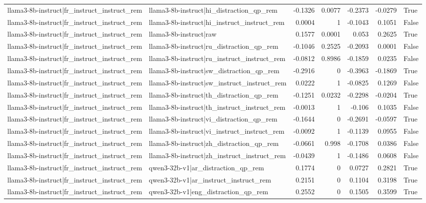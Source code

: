 \begin{table}
\begin{tabular}{l l r r r r l}
llama3-8b-instruct|fr_instruct_instruct_rem & llama3-8b-instruct|hi_distraction_qp_rem & -0.1326 & 0.0077 & -0.2373 & -0.0279 & True \\
llama3-8b-instruct|fr_instruct_instruct_rem & llama3-8b-instruct|hi_instruct_instruct_rem & 0.0004 & 1 & -0.1043 & 0.1051 & False \\
llama3-8b-instruct|fr_instruct_instruct_rem & llama3-8b-instruct|raw & 0.1577 & 0.0001 & 0.053 & 0.2625 & True \\
llama3-8b-instruct|fr_instruct_instruct_rem & llama3-8b-instruct|ru_distraction_qp_rem & -0.1046 & 0.2525 & -0.2093 & 0.0001 & False \\
llama3-8b-instruct|fr_instruct_instruct_rem & llama3-8b-instruct|ru_instruct_instruct_rem & -0.0812 & 0.8986 & -0.1859 & 0.0235 & False \\
llama3-8b-instruct|fr_instruct_instruct_rem & llama3-8b-instruct|sw_distraction_qp_rem & -0.2916 & 0 & -0.3963 & -0.1869 & True \\
llama3-8b-instruct|fr_instruct_instruct_rem & llama3-8b-instruct|sw_instruct_instruct_rem & 0.0222 & 1 & -0.0825 & 0.1269 & False \\
llama3-8b-instruct|fr_instruct_instruct_rem & llama3-8b-instruct|th_distraction_qp_rem & -0.1251 & 0.0232 & -0.2298 & -0.0204 & True \\
llama3-8b-instruct|fr_instruct_instruct_rem & llama3-8b-instruct|th_instruct_instruct_rem & -0.0013 & 1 & -0.106 & 0.1035 & False \\
llama3-8b-instruct|fr_instruct_instruct_rem & llama3-8b-instruct|vi_distraction_qp_rem & -0.1644 & 0 & -0.2691 & -0.0597 & True \\
llama3-8b-instruct|fr_instruct_instruct_rem & llama3-8b-instruct|vi_instruct_instruct_rem & -0.0092 & 1 & -0.1139 & 0.0955 & False \\
llama3-8b-instruct|fr_instruct_instruct_rem & llama3-8b-instruct|zh_distraction_qp_rem & -0.0661 & 0.998 & -0.1708 & 0.0386 & False \\
llama3-8b-instruct|fr_instruct_instruct_rem & llama3-8b-instruct|zh_instruct_instruct_rem & -0.0439 & 1 & -0.1486 & 0.0608 & False \\
llama3-8b-instruct|fr_instruct_instruct_rem & qwen3-32b-v1|ar_distraction_qp_rem & 0.1774 & 0 & 0.0727 & 0.2821 & True \\
llama3-8b-instruct|fr_instruct_instruct_rem & qwen3-32b-v1|ar_instruct_instruct_rem & 0.2151 & 0 & 0.1104 & 0.3198 & True \\
llama3-8b-instruct|fr_instruct_instruct_rem & qwen3-32b-v1|eng_distraction_qp_rem & 0.2552 & 0 & 0.1505 & 0.3599 & True \\

\end{tabular}
\end{table}
